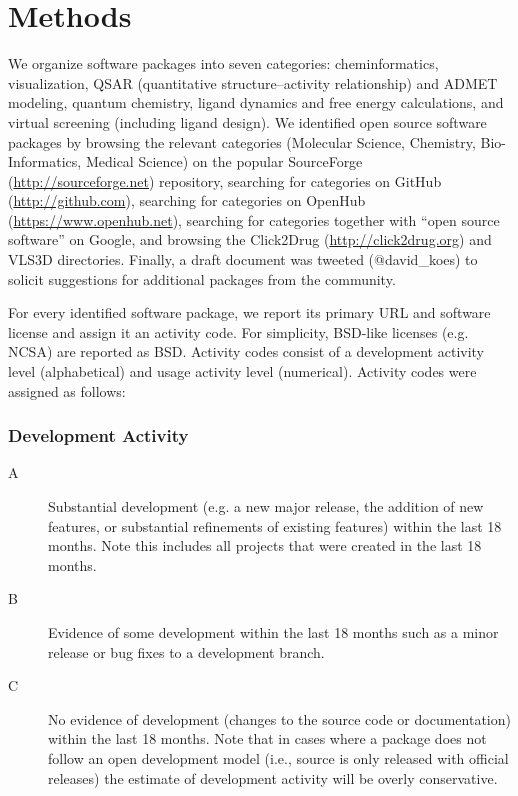 \section{Methods}

We organize software packages into seven categories: cheminformatics, visualization, QSAR (quantitative structure–activity relationship) and ADMET modeling, quantum chemistry, ligand dynamics and free energy calculations, and virtual screening (including ligand design).
We identified open source software packages by browsing the relevant categories (Molecular Science, Chemistry, Bio-Informatics, Medical Science) on the popular SourceForge (\url{http://sourceforge.net}) repository, searching for categories on GitHub (\url{http://github.com}), searching for categories on OpenHub (\url{https://www.openhub.net}), searching for categories together with ``open source software'' on Google, and browsing the Click2Drug (\url{http://click2drug.org}) and VLS3D \cite{Villoutreix_2013} directories.  Finally, a draft document was tweeted (@david_koes) to solicit suggestions for additional packages from the community.

For every identified software package, we report its primary URL and software license and assign it an activity code. For simplicity, BSD-like licenses (e.g. NCSA) are reported as BSD. Activity codes consist of a development activity level (alphabetical) and usage activity level (numerical). Activity codes were assigned as follows:
\subsubsection*{Development Activity}
\begin{description}
  \item[A] Substantial development (e.g. a new major release, the addition of new features, or substantial refinements of existing features) within the last 18 months. Note this includes all projects that were created in the last 18 months.
  \item[B] Evidence of some development within the last 18 months such as a minor release or bug fixes to a development branch.
  \item[C] No evidence of development (changes to the source code or documentation) within the last 18 months. Note that in cases where a package does not follow an open development model (i.e., source is only released with official releases) the estimate of development activity will be overly conservative.
\end{description}
